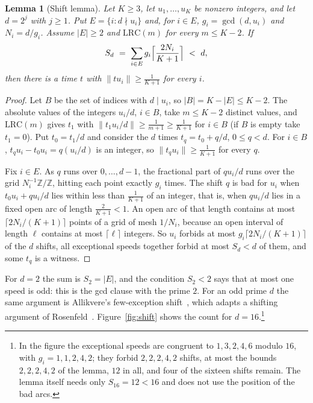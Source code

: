 \documentclass[11pt]{amsart}
\newtheorem{lemma}[theorem]{Lemma}
\theoremstyle{definition}
\theoremstyle{remark}
\newcommand{\Z}{\mathbb{Z}}
\newcommand{\LRC}{\mathrm{LRC}}
\begin{document}
\begin{lemma}[Shift lemma]\label{lem:shift}
Let $K\ge3$, let $u_1,\dots,u_K$ be nonzero integers, and let $d=2^j$ with
$j\ge1$. Put $E=\{i:d\nmid u_i\}$ and, for $i\in E$, $g_i=\gcd(d,u_i)$ and
$N_i=d/g_i$. Assume $|E|\ge2$ and $\LRC(m)$ for every $m\le K-2$. If
\begin{equation}\label{eq:Sd}
 S_d\ =\ \sum_{i\in E}g_i\Bigl\lceil\frac{2N_i}{K+1}\Bigr\rceil\ <\ d,
\end{equation}
then there is a time $t$ with $\|tu_i\|\ge\frac1{K+1}$ for every $i$.
\end{lemma}

\begin{proof}
Let $B$ be the set of indices with $d\mid u_i$, so $|B|=K-|E|\le K-2$. The
absolute values of the integers $u_i/d$, $i\in B$, take $m\le K-2$ distinct
values, and $\LRC(m)$ gives $t_1$ with $\|t_1u_i/d\|\ge\frac1{m+1}\ge
\frac1{K+1}$ for $i\in B$ (if $B$ is empty take $t_1=0$). Put $t_0=t_1/d$
and consider the $d$ times $t_q=t_0+q/d$, $0\le q<d$. For $i\in B$,
$t_qu_i-t_0u_i=q(u_i/d)$ is an integer, so $\|t_qu_i\|\ge\frac1{K+1}$ for
every $q$.

Fix $i\in E$. As $q$ runs over $0,\dots,d-1$, the fractional part of
$qu_i/d$ runs over the grid $N_i^{-1}\Z/\Z$, hitting each point exactly
$g_i$ times. The shift $q$ is bad for $u_i$ when $t_0u_i+qu_i/d$ lies within
less than $\frac1{K+1}$ of an integer, that is, when $qu_i/d$ lies in a
fixed open arc of length $\frac2{K+1}<1$. An open arc of that length
contains at most $\lceil2N_i/(K+1)\rceil$ points of a grid of mesh $1/N_i$,
because an open interval of length $\ell$ contains at most $\lceil\ell\rceil$
integers. So $u_i$ forbids at most $g_i\lceil2N_i/(K+1)\rceil$ of the $d$
shifts, all exceptional speeds together forbid at most $S_d<d$ of them, and
some $t_q$ is a witness.
\end{proof}

For $d=2$ the sum is $S_2=|E|$, and the condition $S_2<2$ says that at most
one speed is odd: this is the gcd clause with the prime $2$. For an odd
prime $d$ the same argument is Allikvere's few-exception
shift~\cite[Lemma~4.6]{All26}, which adapts a shifting argument of
Rosenfeld~\cite[Lemma~5]{Ros26b}. Figure~\ref{fig:shift} shows the count for
$d=16$.\footnote{In the figure the exceptional speeds are congruent to
$1,3,2,4,6$ modulo $16$, with $g_i=1,1,2,4,2$; they forbid $2,2,2,4,2$ shifts,
at most the bounds $2,2,2,4,2$ of the lemma, $12$ in all, and four of the
sixteen shifts remain. The lemma itself needs only $S_{16}=12<16$ and does
not use the position of the bad arcs.}
\end{document}

